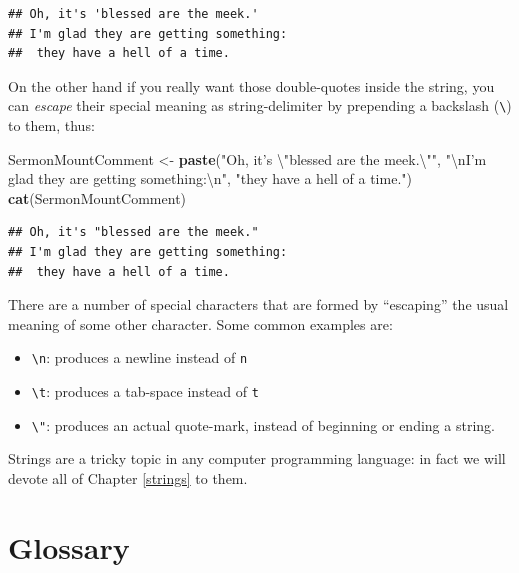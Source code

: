 \documentclass[]{book}
\makeatletter
\newenvironment{Shaded}{\begin{snugshade}}{\end{snugshade}}
\newcommand{\KeywordTok}[1]{\textcolor[rgb]{0.13,0.29,0.53}{\textbf{#1}}}
\newcommand{\CharTok}[1]{\textcolor[rgb]{0.31,0.60,0.02}{#1}}
\newcommand{\StringTok}[1]{\textcolor[rgb]{0.31,0.60,0.02}{#1}}
\newcommand{\NormalTok}[1]{#1}
\providecommand{\tightlist}{%
  \setlength{\itemsep}{0pt}\setlength{\parskip}{0pt}}
\newenvironment{kframe}{%
\medskip{}
\setlength{\fboxsep}{.8em}
 \def\at@end@of@kframe{}%
 \ifinner\ifhmode%
  \def\at@end@of@kframe{\end{minipage}}%
  \begin{minipage}{\columnwidth}%
 \fi\fi%
 \def\FrameCommand##1{\hskip\@totalleftmargin \hskip-\fboxsep
 \colorbox{shadecolor}{##1}\hskip-\fboxsep
     \hskip-\linewidth \hskip-\@totalleftmargin \hskip\columnwidth}%
 \MakeFramed {\advance\hsize-\width
   \@totalleftmargin\z@ \linewidth\hsize
   \@setminipage}}%
 {\par\unskip\endMakeFramed%
 \at@end@of@kframe}
\renewenvironment{Shaded}{\begin{kframe}}{\end{kframe}}
\theoremstyle{definition}
\theoremstyle{definition}
\theoremstyle{definition}
\theoremstyle{remark}
\makeatother
\begin{document}
\begin{verbatim}
## Oh, it's 'blessed are the meek.' 
## I'm glad they are getting something:
##  they have a hell of a time.
\end{verbatim}

On the other hand if you really want those double-quotes inside the
string, you can \emph{escape} their special meaning as string-delimiter
by prepending a backslash (\texttt{\textbackslash{}}) to them, thus:

\begin{Shaded}
\begin{Highlighting}[]
\NormalTok{SermonMountComment <-}\StringTok{ }\KeywordTok{paste}\NormalTok{(}\StringTok{"Oh, it's }\CharTok{\textbackslash{}"}\StringTok{blessed are the meek.}\CharTok{\textbackslash{}"}\StringTok{"}\NormalTok{,}
                     \StringTok{"}\CharTok{\textbackslash{}n}\StringTok{I'm glad they are getting something:}\CharTok{\textbackslash{}n}\StringTok{"}\NormalTok{,}
                     \StringTok{"they have a hell of a time."}\NormalTok{)}
\KeywordTok{cat}\NormalTok{(SermonMountComment)}
\end{Highlighting}
\end{Shaded}

\begin{verbatim}
## Oh, it's "blessed are the meek." 
## I'm glad they are getting something:
##  they have a hell of a time.
\end{verbatim}

There are a number of special characters that are formed by ``escaping''
the usual meaning of some other character. Some common examples are:

\begin{itemize}
\tightlist
\item
  \texttt{\textbackslash{}n}: produces a newline instead of \texttt{n}
\item
  \texttt{\textbackslash{}t}: produces a tab-space instead of \texttt{t}
\item
  \texttt{\textbackslash{}"}: produces an actual quote-mark, instead of
  beginning or ending a string.
\end{itemize}

Strings are a tricky topic in any computer programming language: in fact
we will devote all of Chapter \ref{strings} to them.

\newpage

\section*{Glossary}\label{idea-glossary}
\end{document}
